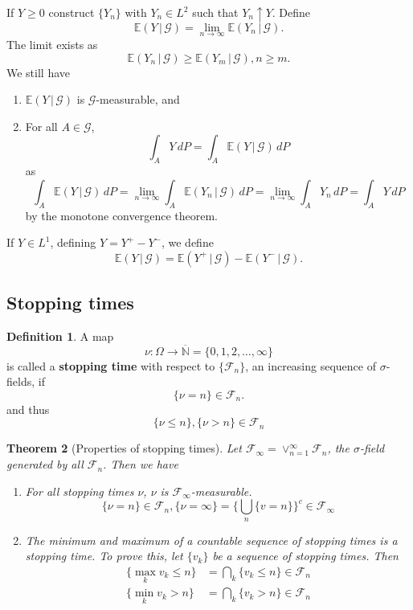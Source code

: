 \documentclass[10pt, oneside, reqno]{amsart}
\theoremstyle{plain}%
\newtheorem{thm}{Theorem}[section]
\theoremstyle{definition}
\newtheorem{defn}[thm]{Definition}
\theoremstyle{remark}
\newcommand{\given}{ \, | \,}
\newcommand{\sigf}{\mathcal{F}}
\newcommand{\E}{\mathbb{E}}
\newcommand{\N}{\mathbb{N}}
\newcommand{\sigg}{\mathcal{G}}
\begin{document}
If $Y \geq 0$ construct $\{ Y_n \}$ with $Y_n \in L^2$ such that $Y_n \uparrow Y$.  Define \[
    \E(Y \given \sigg) = \lim_{n \rightarrow \infty} \E(Y_n \given \sigg).
\] The limit exists as \[
    \E(Y_n \given \sigg) \geq \E(Y_m \given \sigg), n \geq m.
\]  We still have 
\begin{enumerate}[(1)]

    \item $\E(Y \given \sigg)$ is $\sigg$-measurable, and 
    \item For all $A \in \sigg$, \[
        \int_A Y \, dP = \int_A \E(Y \given \sigg) \, dP
    \] as \[
        \int_A \E(Y \given \sigg) \, dP= \lim_{n \rightarrow \infty} \int_A \E(Y_n \given \sigg) \, dP = \lim_{n \rightarrow \infty} \int_A Y_n \, dP  = \int_A Y \, dP
    \] by the monotone convergence theorem.  
\end{enumerate}

If $Y \in L^1$, defining $Y = Y^+ - Y^-$, we define \[
    \E(Y \given \sigg) = \E(Y^+ \given \sigg) - \E(Y^- \given \sigg).  
\]

\subsection{Stopping times} %
\label{sub:stopping_times}

\begin{defn}
    A map \[
        \nu : \Omega \rightarrow \overline{\N} = \{ 0, 1, 2, \dots, \infty \}
    \] is called a \textbf{stopping time} with respect to $\{ \sigf_n \}$, an increasing sequence of $\sigma$-fields, if \[
        \{ \nu = n \} \in \sigf_n.
    \] and thus \[
        \{ \nu \leq n \}, \{ \nu > n \} \in \sigf_n
    \]
\end{defn}

\begin{thm}[Properties of stopping times]
    Let $\sigf_\infty = \vee_{n=1}^\infty \sigf_n$, the $\sigma$-field generated by all $\sigf_n$.   Then we have 
    \begin{enumerate}[(1)]
        \item For all stopping times $\nu$, $\nu$ is $\sigf_\infty$-measurable.\[
            \{ \nu = n \} \in \sigf_n, \{ \nu = \infty \} = \{ \bigcup_{n} \{ v = n \} \}^c \in \sigf_\infty
        \]
        \item The minimum and maximum of a countable sequence of stopping times is a stopping time.  To prove this, let $\{ v_k\}$ be a sequence of stopping times.  Then \begin{align*}
        \{ \max_{k} v_k \leq n \} &= \bigcap_k \{ v_k \leq n \} \in \sigf_n \\
        \{ \min_{k} v_k > n \} &= \bigcap_k \{ v_k > n \} \in \sigf_n                           
        \end{align*}
    \end{enumerate} 
\end{thm}
\end{document}
